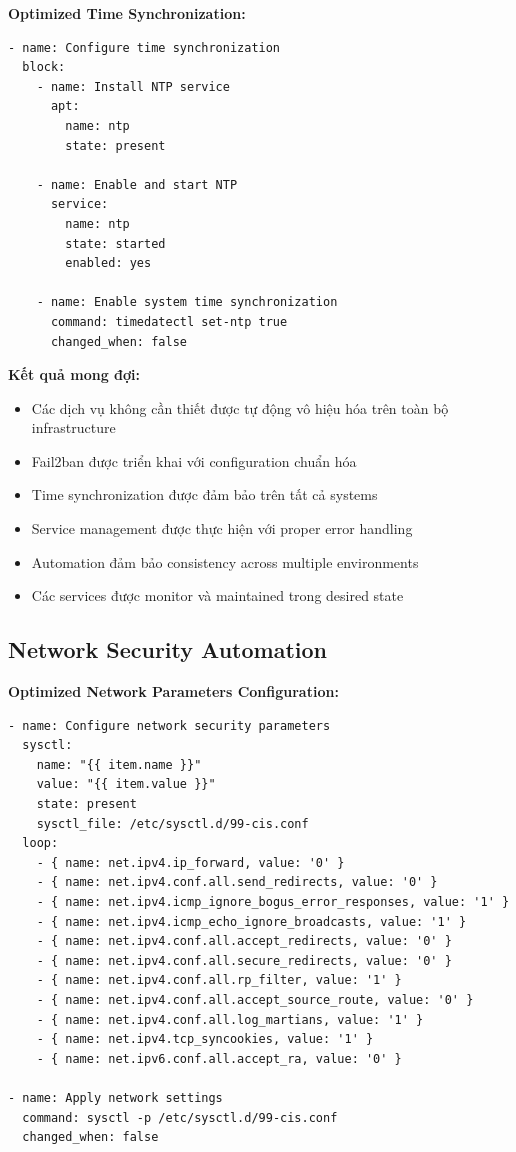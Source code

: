 \noindent \textbf{Optimized Time Synchronization:}
\begin{verbatim}
- name: Configure time synchronization
  block:
    - name: Install NTP service
      apt:
        name: ntp
        state: present

    - name: Enable and start NTP
      service:
        name: ntp
        state: started
        enabled: yes

    - name: Enable system time synchronization
      command: timedatectl set-ntp true
      changed_when: false
\end{verbatim}

\noindent \textbf{Kết quả mong đợi:}
\begin{itemize}
\item Các dịch vụ không cần thiết được tự động vô hiệu hóa trên toàn bộ infrastructure
\item Fail2ban được triển khai với configuration chuẩn hóa
\item Time synchronization được đảm bảo trên tất cả systems
\item Service management được thực hiện với proper error handling
\item Automation đảm bảo consistency across multiple environments
\item Các services được monitor và maintained trong desired state
\end{itemize}

\subsection{Network Security Automation}

\noindent \textbf{Optimized Network Parameters Configuration:}
\begin{verbatim}
- name: Configure network security parameters
  sysctl:
    name: "{{ item.name }}"
    value: "{{ item.value }}"
    state: present
    sysctl_file: /etc/sysctl.d/99-cis.conf
  loop:
    - { name: net.ipv4.ip_forward, value: '0' }
    - { name: net.ipv4.conf.all.send_redirects, value: '0' }
    - { name: net.ipv4.icmp_ignore_bogus_error_responses, value: '1' }
    - { name: net.ipv4.icmp_echo_ignore_broadcasts, value: '1' }
    - { name: net.ipv4.conf.all.accept_redirects, value: '0' }
    - { name: net.ipv4.conf.all.secure_redirects, value: '0' }
    - { name: net.ipv4.conf.all.rp_filter, value: '1' }
    - { name: net.ipv4.conf.all.accept_source_route, value: '0' }
    - { name: net.ipv4.conf.all.log_martians, value: '1' }
    - { name: net.ipv4.tcp_syncookies, value: '1' }
    - { name: net.ipv6.conf.all.accept_ra, value: '0' }

- name: Apply network settings
  command: sysctl -p /etc/sysctl.d/99-cis.conf
  changed_when: false
\end{verbatim}


